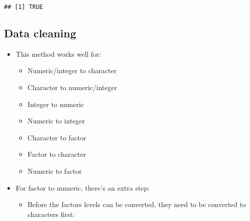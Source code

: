 \documentclass[]{article}
\newenvironment{Shaded}{\begin{snugshade}}{\end{snugshade}}
\newcommand{\KeywordTok}[1]{\textcolor[rgb]{0.13,0.29,0.53}{\textbf{#1}}}
\newcommand{\StringTok}[1]{\textcolor[rgb]{0.31,0.60,0.02}{#1}}
\newcommand{\OperatorTok}[1]{\textcolor[rgb]{0.81,0.36,0.00}{\textbf{#1}}}
\newcommand{\NormalTok}[1]{#1}
\providecommand{\tightlist}{%
  \setlength{\itemsep}{0pt}\setlength{\parskip}{0pt}}
\begin{document}
\begin{verbatim}
## [1] TRUE
\end{verbatim}

\begin{Shaded}
\end{Shaded}

\subsection{Data cleaning}\label{data-cleaning-4}

\begin{itemize}
\tightlist
\item
  This method works well for:

  \begin{itemize}
  \tightlist
  \item
    Numeric/integer to character
  \item
    Character to numeric/integer
  \item
    Integer to numeric
  \item
    Numeric to integer
  \item
    Character to factor
  \item
    Factor to character
  \item
    Numeric to factor
  \end{itemize}
\item
  For factor to numeric, there's an extra step:

  \begin{itemize}
  \tightlist
  \item
    Before the factors levels can be converted, they need to be
    converted to characters first:
  \end{itemize}
\end{itemize}

\begin{Shaded}
\end{Shaded}
\end{document}
